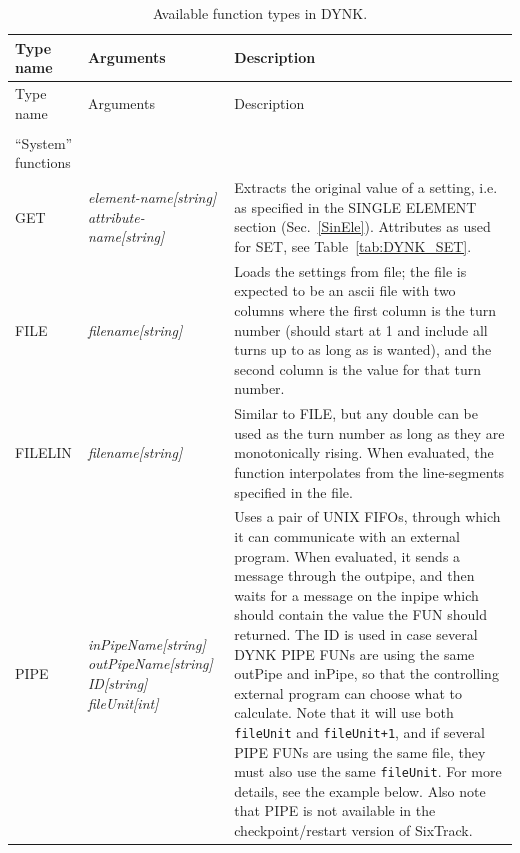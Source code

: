 \pagebreak
\begin{center}
\begin{longtable}{|p{2.25cm} | p{4cm} p{9.5cm}|}
  \caption{Available function types in DYNK.}
  \label{tab:DYNK_FUN} \\*
  \hline
  \rowcolor{blue!30}
  Type name & Arguments & Description \\*
  \hline
  \endfirsthead

  \hline
  \rowcolor{blue!30}
  Type name & Arguments & Description \\*
  \endhead

  \rowcolor{gray!15}
  \multicolumn{3}{|c|}{(The table continues on the next page)}\\*
  \hline
  \endfoot
  
  \hline
  \endlastfoot

  \rowcolor{blue!15}
  ``System'' functions & & \\*

  GET        & \emph{element-name[string] attribute-name[string]} & 
  Extracts the original value of a setting, i.e. as specified in the SINGLE ELEMENT section (Sec.~\ref{SinEle}). Attributes as used for SET, see Table~\ref{tab:DYNK_SET}. \\*

  FILE       & \emph{filename[string]} &
  Loads the settings from file; the file is expected to be an ascii file with two columns where the first column is the turn number (should start at 1 and include all turns up to as long as is wanted), and the second column is the value for that turn number.\\*
  
  FILELIN    & \emph{filename[string]} &
  Similar to FILE, but any double can be used as the turn number as long as they are monotonically rising.
  When evaluated, the function interpolates from the line-segments specified in the file. \\*
  
  PIPE       & \emph{inPipeName[string] outPipeName[string] ID[string] fileUnit[int]} &
  Uses a pair of UNIX FIFOs, through which it can communicate with an external program.
  When evaluated, it sends a message through the outpipe, and then waits for a message on the inpipe which should contain the value the FUN should returned.
  The ID is used in case several DYNK PIPE FUNs are using the same outPipe and inPipe, so that the controlling external program can choose what to calculate.
  Note that it will use both \texttt{fileUnit} and \texttt{fileUnit+1}, and if several PIPE FUNs are using the same file, they must also use the same \texttt{fileUnit}.
  For more details, see the example below.
  Also note that PIPE is not available in the checkpoint/restart version of SixTrack.\\*
  

\end{longtable}
\end{center}
